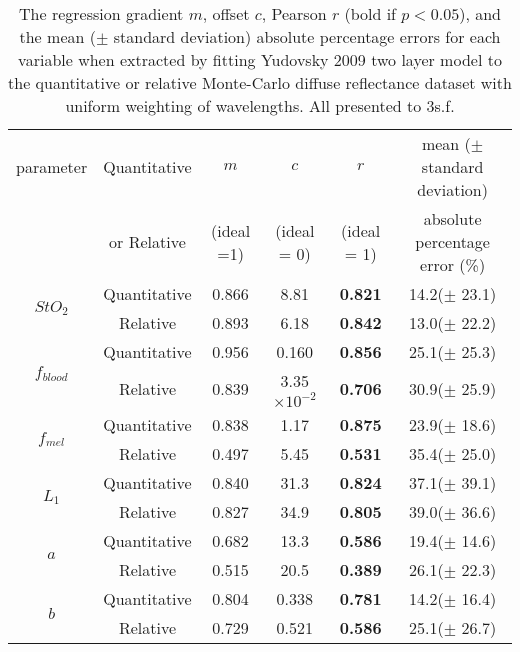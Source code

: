 \begin{subappendices}
\begin{table}[h]
    \centering
    \caption{The regression gradient $m$, offset $c$, Pearson $r$ (bold if $p<0.05$), and the mean ($\pm$ standard deviation) absolute percentage errors for each variable when extracted by fitting Yudovsky 2009 two layer model to the quantitative or relative Monte-Carlo diffuse reflectance dataset with uniform weighting of wavelengths. All presented to 3s.f.}
    \begin{tabular}{|c|c|cccc|}
        \hline
        parameter & Quantitative & $m$ & $c$ & $r$ & mean ($\pm$ standard deviation) \\
        & or Relative & (ideal =1) & (ideal = 0) & (ideal = 1) & absolute percentage error (\%)\\
        \hline
        \multirow{2}{*}{$StO_2$} & Quantitative & 0.866 & 8.81 & \textbf{0.821} & 14.2($\pm$ 23.1) \\
        & Relative & 0.893 & 6.18 & \textbf{0.842} & 13.0($\pm$ 22.2) \\
        \hline
        \multirow{2}{*}{$f_{blood}$} & Quantitative & 0.956 & 0.160 & \textbf{0.856} & 25.1($\pm$ 25.3) \\
        & Relative & 0.839 & 3.35$\times 10^{-2}$ & \textbf{0.706} & 30.9($\pm$ 25.9) \\
        \hline
        \multirow{2}{*}{$f_{mel}$} & Quantitative & 0.838 & 1.17 & \textbf{0.875} & 23.9($\pm$ 18.6) \\
        & Relative & 0.497 & 5.45 & \textbf{0.531} & 35.4($\pm$ 25.0) \\
        \hline
        \multirow{2}{*}{$L_1$} & Quantitative & 0.840 & 31.3 & \textbf{0.824} & 37.1($\pm$ 39.1) \\
         & Relative & 0.827 & 34.9 & \textbf{0.805} & 39.0($\pm$ 36.6) \\
        \hline
        \multirow{2}{*}{$a$} & Quantitative & 0.682 & 13.3 & \textbf{0.586} & 19.4($\pm$ 14.6) \\
        & Relative & 0.515 & 20.5 & \textbf{0.389} & 26.1($\pm$ 22.3) \\
        \hline
        \multirow{2}{*}{$b$} & Quantitative & 0.804 & 0.338 & \textbf{0.781} & 14.2($\pm$ 16.4) \\
        & Relative & 0.729 & 0.521 & \textbf{0.586} & 25.1($\pm$ 26.7) \\
        \hline
    \end{tabular}
    \label{tb:doubleparamtrendsuniform}
\end{table}
\FloatBarrier


\end{subappendices}
